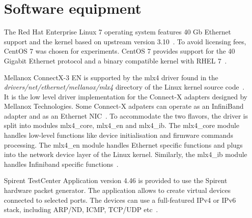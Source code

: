 
\section{Software equipment}\label{sec:analysis-software}
The Red Hat Enterprise Linux 7 operating system features 40 Gb Ethernet support and
the kernel based on upstream version 3.10~\cite{rhel-7-announce}.
To avoid licensing fees, CentOS 7 was chosen for experiments.
CentOS 7 provides support for the 40 Gigabit Ethernet protocol and a binary compatible kernel with RHEL 7~\cite{centos-7-announce}.

Mellanox ConnectX-3 EN is supported by the mlx4 driver found in the
{\it{drivers/net/ethernet/mellanox/mlx4}} directory of the Linux kernel source code~\cite{kernel-source}.
It is the low level driver implementation for the Connect-X adapters designed by Mellanox Technologies.
Some Connect-X adpaters can operate as an InfiniBand adapter and as an Ethernet NIC~\cite{mellanox-user-manual}.
To accommodate the two flavors, the driver is split into modules mlx4\_core, mlx4\_en and mlx4\_ib.
The mlx4\_core module handles low-level functions like device initialisation and firmware commands processing.
The mlx4\_en module handles Ethernet specific functions and
plugs into the network device layer of the Linux kernel.
Similarly, the mlx4\_ib module handles Infiniband specific functions~\cite{mellanox-user-manual}.

Spirent TestCenter Application version 4.46 is provided to use the Spirent hardware packet generator.
The application allows to create virtual devices connected to selected ports.
The devices can use a full-featured IPv4 or IPv6 stack, including ARP/ND, ICMP, TCP/UDP etc~\cite{spirent-app}.
